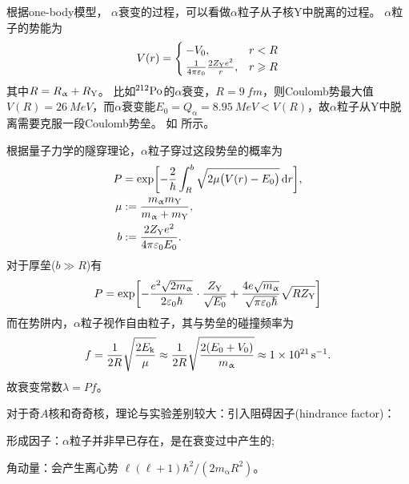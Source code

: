 根据one-body模型，
$\alpha$衰变的过程，可以看做$\alpha$粒子从子核Y中脱离的过程。
$\alpha$粒子的势能为
\begin{align}
	V(r) = \begin{cases}
		-V_0,&r < R\\
		\frac1{4\pi\varepsilon_0}\frac{2Z_{\mathrm{Y}}e^2}r,&r \geqslant R
	\end{cases}
\end{align}
其中$R = R_\upalpha + R_{\mathrm{Y}}$。
比如$\nuclide{212}{Po}$的$\alpha$衰变，$R = \qty{9}{fm}$，则Coulomb势最大值$V(R) = \qty{26}{MeV}$，而$\alpha$衰变能$E_0 = Q_\upalpha = \qty{8.95}{MeV} < V(R)$，故$\alpha$粒子从Y中脱离需要克服一段Coulomb势垒。
如 所示。
\begin{notecaptionblock}
	\label{fig:Coulomb well}
\end{notecaptionblock}
根据量子力学的隧穿理论，$\alpha$粒子穿过这段势垒的概率为
\begin{subequations}
	\begin{align}
		P &= \exp\biggl[-\frac2\hbar\int_R^b\sqrt{2\mu\bigl(V(r) - E_0\bigr)}\mathop{}\!\mathrm{d} r\biggr],\\
		\mu &:= \frac{m_\upalpha m_{\mathrm{Y}}}{m_\upalpha + m_{\mathrm{Y}}},\\
		b &:= \frac{2Z_{\mathrm{Y}}e^2}{4\pi\varepsilon_0 E_0}.
	\end{align}
\end{subequations}
对于厚垒($b \gg R$)有
\begin{equation}
	P = \exp\biggl[-\frac{e^2\sqrt{2m_\upalpha}}{2\varepsilon_0\hbar} \cdot \frac{Z_{\mathrm{Y}}}{\sqrt{E_0}} + \frac{4e\sqrt{m_\upalpha }}{\sqrt{\pi\varepsilon_0\hbar}}\sqrt{RZ_{\mathrm{Y}}}\biggr]
\end{equation}
而在势阱内，$\alpha$粒子视作自由粒子，其与势垒的碰撞频率为
\begin{equation}
	f = \frac1{2R}\sqrt{\frac{2E_{\mathrm{k}}}{\mu}} \approx \frac1{2R}\sqrt{\frac{2(E_0 + V_0)}{m_\upalpha}} \approx \qty{1e21}{\per\second}.
\end{equation}
故衰变常数$\lambda = Pf$。

\begin{remark}
	对于奇$A$核和奇奇核，理论与实验差别较大：引入阻碍因子(hindrance factor)：
	\begin{compactenum}
		\item 形成因子：$\alpha$粒子并非早已存在，是在衰变过中产生的;
		\item 角动量：会产生离心势 $\ell(\ell + 1)\hbar^2/(2m_\upalpha R^2)$。
	\end{compactenum}
\end{remark}
